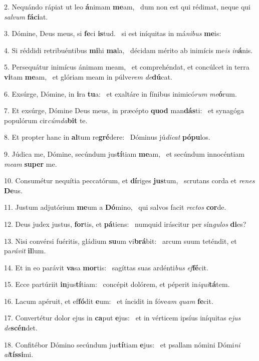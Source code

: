 2. Nequándo rápiat ut leo \textbf{á}nimam \textbf{me}am, \ast\  dum non est qui rédimat, neque qui \textit{sal}\textit{vum} \textbf{fá}\textbf{ci}at.\

3. Dómine, Deus meus, si \textbf{fe}ci \textbf{is}tud. \ast\  si est iníquitas in má\textit{ni}\textit{bus} \textbf{me}is:\

4. Si réddidi retribuéntibus \textbf{mi}hi \textbf{ma}la, \ast\  décidam mérito ab inimícis me\textit{is} \textit{in}\textbf{á}nis.\

5. Persequátur inimícus ánimam meam, \dag\  et comprehéndat, et concúlcet in terra \textbf{vi}tam \textbf{me}am, \ast\  et glóriam meam in púlve\textit{rem} \textit{de}\textbf{dú}cat.\

6. Exsúrge, Dómine, in \textbf{i}ra \textbf{tu}a: \ast\  et exaltáre in fínibus inimicó\textit{rum} \textit{me}\textbf{ó}rum.\

7. Et exsúrge, Dómine Deus meus, in præcépto \textbf{quod} man\textbf{dás}ti: \ast\  et synagóga populórum cir\textit{cúm}\textit{da}\textbf{bit} te.\

8. Et propter hanc in \textbf{al}tum re\textbf{gré}dere: \ast\  Dóminus jú\textit{di}\textit{cat} \textbf{pó}\textbf{pu}los.\

9. Júdica me, Dómine, secúndum jus\textbf{tí}tiam \textbf{me}am, \ast\  et secúndum innocéntiam \textit{me}\textit{am} \textbf{su}\textbf{per} me.\

10. Consumétur nequítia peccatórum, et \textbf{dí}riges \textbf{jus}tum, \ast\  scrutans corda et \textit{re}\textit{nes} \textbf{De}us.\

11. Justum adjutórium \textbf{me}um a \textbf{Dó}mino, \ast\  qui salvos facit \textit{rec}\textit{tos} \textbf{cor}de.\

12. Deus judex justus, \textbf{for}tis, et \textbf{pá}tiens: \ast\  numquid iráscitur per sín\textit{gu}\textit{los} \textbf{di}es?\

13. Nisi convérsi fuéritis, gládium \textbf{su}um vi\textbf{brá}bit: \ast\  arcum suum teténdit, et pa\textit{rá}\textit{vit} \textbf{il}lum.\

14. Et in eo parávit \textbf{va}sa \textbf{mor}tis: \ast\  sagíttas suas ardénti\textit{bus} \textit{ef}\textbf{fé}cit.\

15. Ecce partúriit \textbf{in}jus\textbf{tí}tiam: \ast\  concépit dolórem, et péperit in\textit{i}\textit{qui}\textbf{tá}tem.\

16. Lacum apéruit, et ef\textbf{fó}dit \textbf{e}um: \ast\  et íncidit in fóve\textit{am} \textit{quam} \textbf{fe}cit.\

17. Convertétur dolor ejus in \textbf{ca}put \textbf{e}jus: \ast\  et in vérticem ipsíus iníquitas e\textit{jus} \textit{de}\textbf{scén}det.\

18. Confitébor Dómino secúndum jus\textbf{tí}tiam \textbf{e}jus: \ast\  et psallam nómini Dómi\textit{ni} \textit{al}\textbf{tís}\textbf{si}mi.\

